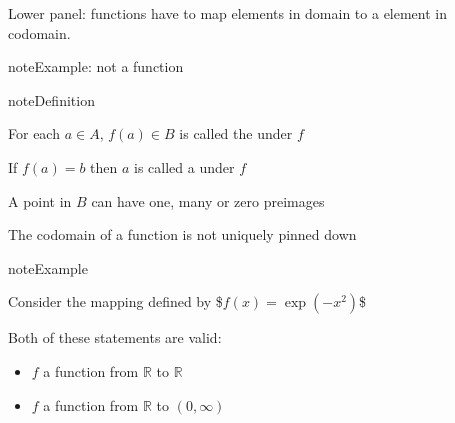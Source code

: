\documentclass[letterpaper,10pt,english]{jupyterBook}
\begin{document}
\begin{figure}[htbp]
\centering

\noindent{}
\end{figure}

\sphinxAtStartPar
Lower panel: functions have to map  elements in domain to a  element in codomain.

\begin{sphinxadmonition}{note}{Example: not a function}

\begin{figure}[H]
\centering

\noindent{}
\end{figure}
\end{sphinxadmonition}

\begin{sphinxadmonition}{note}{Definition}

\sphinxAtStartPar
For each \(a \in A\), \(f(a) \in B\) is called the  under \(f\)
\end{sphinxadmonition}

\begin{figure}[htbp]
\centering

\noindent{}
\end{figure}

\sphinxAtStartPar
If \(f(a) = b\) then \(a\) is called a  under \(f\)

\begin{figure}[htbp]
\centering

\noindent{}
\end{figure}

\sphinxAtStartPar
A point in \(B\) can have one, many or zero preimages

\begin{figure}[htbp]
\centering

\noindent{}
\end{figure}

\sphinxAtStartPar
The codomain of a function is not uniquely pinned down

\begin{sphinxadmonition}{note}{Example}

\sphinxAtStartPar
Consider the mapping defined by
\$\(f(x) = \exp(-x^2)\)\$

\sphinxAtStartPar
Both of these statements are valid:
\begin{itemize}
\item {} 
\sphinxAtStartPar
\(f\) a function from \(\mathbb{R}\) to \(\mathbb{R}\)

\item {} 
\sphinxAtStartPar
\(f\) a function from \(\mathbb{R}\) to \((0, \infty)\)

\end{itemize}
\end{sphinxadmonition}
\end{document}
